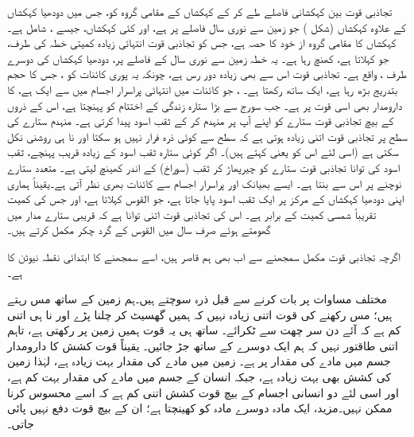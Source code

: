 تجاذبی قوت  بین کہکشانی  فاصلے طے کر کے کہکشاں کے مقامی گروہ کو، جس میں دودھیا کہکشاں کے علاوہ کہکشاں (شکل ) جو زمین  سے  نوری سال فاصلے پر ہے،   اور کئی  کہکشاں، جیسے ، شامل ہے۔ کہکشاں کا مقامی گروہ   از خود  کا حصہ ہے، جس کو تجاذبی قوت  انتہائی زیادہ کمیتی خطہ کی طرف، جو   کہلاتا ہے،  کھنچ رہا ہے۔ یہ خطہ زمین سے   نوری سال کے فاصلے پر، دودھیا کہکشاں کی دوسرے طرف ، واقع ہے۔ تجاذبی قوت اس سے بھی زیادہ دور رس ہے، چونکہ یہ پوری کائنات کو ، جس کا حجم بتدریج بڑھ  رہا ہے،  ایک ساتھ رکھتا ہے۔
   ، جو کائنات میں انتہائی پراسرار اجسام میں سے ایک ہے، کا دارومدار بھی اسی قوت پر ہے۔ جب  سورج  سے بڑا  ستارہ   زندگی کے اختتام کو پہنچتا ہے،  اس کے ذروں کے  بیچ تجاذبی قوت   ستارے کو   اپنے آپ پر  منہدم   کر کے ثقب اسود پیدا کرتی ہے۔ منہدم ستارے کی سطح پر تجاذبی قوت اتنی زیادہ   ہوتی ہے  کہ سطح سے   کوئی ذرہ  فرار نہیں  ہو سکتا اور نا ہی  روشنی نکل سکتی ہے (اسی لئے اس کو   یعنی  کہتے ہیں)۔ اگر کوئی ستارہ ثقب اسود کے زیادہ قریب پہنچے، ثقب اسود  کی توانا  تجاذبی قوت   ستارے کو   چیرپھاڑ  کر  ثقب (سوراخ) کے اندر کھینچ لیتی ہے۔ متعدد ستارے نوچنے   پر اس سے    بنتا ہے۔ ایسے  بھیانک  اور پراسرار اجسام سے کائنات  بھری نظر آتی ہے۔یقیناً  ہماری اپنی دودھیا کہکشاں  کے مرکز پر  ایک ثقب اسود پایا جاتا ہے، جو   القوس   کہلاتا ہے، اور جس کی کمیت تقریباً   شمسی  کمیت کے برابر   ہے۔ اس کی تجاذبی قوت اتنی توانا ہے کہ   قریبی ستارے مدار میں گھومتے  ہوئے صرف  سال میں القوس  کے گرد  چکر مکمل کرتے ہیں۔

اگرچہ  تجاذبی قوت  مکمل سمجھنے سے اب بھی ہم قاصر ہیں، اسے سمجھنے کا ابتدائی نقطہ  نیوٹن کا  ہے۔

مختلف مساوات پر بات کرنے سے قبل ذرہ سوچتے ہیں۔ہم زمین   کے ساتھ مس رہتے ہیں؛ مس رکھنے کی قوت اتنی زیادہ نہیں کہ ہمیں گھسیٹ کر چلنا پڑے اور نا ہی اتنی کم ہے کہ آئے دن سر چھت سے ٹکرائے۔ ساتھ ہی یہ قوت ہمیں زمین پر رکھتی ہے، تاہم اتنی طاقتور نہیں کہ ہم ایک دوسرے کے ساتھ جڑ جائیں۔ یقیناً  قوت کشش کا دارومدار  جسم میں مادے کی مقدار پر ہے۔ زمین میں مادے کی مقدار بہت  زیادہ ہے، لہٰذا زمین  کی کشش بھی بہت زیادہ ہے، جبکہ  انسان کے جسم میں مادے کی مقدار بہت کم ہے، اور اسی لئے دو انسانی اجسام کے بیچ قوت کشش  اتنی کم ہے کہ اسے محسوس کرنا ممکن نہیں۔مزید، ایک  مادہ  دوسرے مادہ کو کھینچتا ہے؛ ان کے بیچ قوت دفع نہیں پائی جاتی۔

